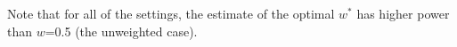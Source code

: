 \documentclass[11pt]{article} %
\begin{document}
Note that  for all of the settings, the estimate of the optimal $w^{*}$ has  higher power than $w$=0.5 (the unweighted case).

\end{document}
